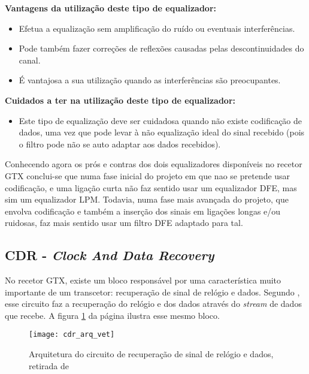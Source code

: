 \textbf{Vantagens da utilização deste tipo de equalizador:}
\begin{itemize}
	\item Efetua a equalização sem amplificação do ruído ou eventuais interferências.
	\item Pode também fazer correções de reflexões causadas pelas descontinuidades do canal. 
	\item É vantajosa a sua utilização quando as interferências são preocupantes.
\end{itemize}

\textbf{Cuidados a ter na utilização deste tipo de equalizador:}
\begin{itemize}
	\item Este tipo de equalização deve ser cuidadosa quando não existe codificação de dados, uma vez que pode levar à não equalização ideal do sinal recebido (pois o filtro pode não se auto adaptar aos dados recebidos).
\end{itemize}

Conhecendo agora os prós e contras dos dois equalizadores disponíveis no recetor GTX conclui-se que numa fase inicial do projeto em que nao se pretende usar codificação, e uma ligação curta não faz sentido usar um equalizador DFE, mas sim um equalizador LPM. Todavia, numa fase mais avançada do projeto, que envolva codificação e também a inserção dos sinais em ligações longas e/ou ruidosas, faz mais sentido usar um filtro DFE adaptado para tal. 
\subsection{CDR - \textit{Clock And Data Recovery}}

No recetor GTX, existe um bloco responsável por uma característica muito importante de um transcetor: recuperação de sinal de relógio e dados. Segundo \cite{R011}, esse circuito faz a recuperação do relógio e dos dados através do \textit{stream} de dados que recebe. A figura \ref{fig:cdr_arq} da página \pageref{fig:cdr_arq} ilustra esse mesmo bloco.

\begin{figure}[h!]
	\begin{center}
		\leavevmode
		\texttt{[image: cdr\_arq\_vet]}
		\caption{Arquitetura do circuito de recuperação de sinal de relógio e dados, retirada de \cite{R011}}
		\label{fig:cdr_arq}
	\end{center}
\end{figure}


